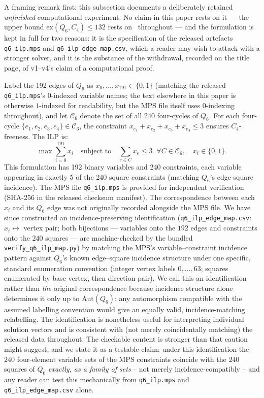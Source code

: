 \documentclass[12pt]{article}
\newcommand{\ex}{\mathrm{ex}}
\begin{document}
A framing remark first: this subsection documents a deliberately retained
\emph{unfinished} computational experiment. No claim in this paper rests
on it --- the upper bound $\ex(Q_6,C_4)\le132$ rests on~\cite{HN94}
throughout --- and the formulation is kept in full for two reasons: it is
the specification of the released artefacts \texttt{q6\_ilp.mps} and
\texttt{q6\_ilp\_edge\_map.csv}, which a reader may wish to attack with a
stronger solver, and it is the substance of the withdrawal, recorded on
the title page, of v1--v4's claim of a computational proof.

Label the 192 edges of $Q_6$ as $x_0,\ldots,x_{191}\in\{0,1\}$
(matching the released \texttt{q6\_ilp.mps}'s $0$-indexed variable
names; the text elsewhere in this paper is otherwise $1$-indexed for
readability, but the MPS file itself uses $0$-indexing throughout),
and let $\mathcal{C}_6$ denote the set of all 240 four-cycles of $Q_6$.
For each four-cycle $\{e_1,e_2,e_3,e_4\}\in\mathcal{C}_6$,
the constraint $x_{e_1}+x_{e_2}+x_{e_3}+x_{e_4}\le3$ ensures $C_4$-freeness.
The ILP is:
\[
  \max\sum_{i=0}^{191}x_i \quad\text{subject to}\quad
  \sum_{e\in C}x_e\le3\;\;\forall C\in\mathcal{C}_6,\quad x_i\in\{0,1\}.
\]
This formulation has 192 binary variables and 240 constraints, each
variable appearing in exactly 5 of the 240 square constraints (matching
$Q_6$'s edge-square incidence). The MPS file \texttt{q6\_ilp.mps} is
provided for independent verification (SHA-256 in the released checksum
manifest). The correspondence between each $x_i$ and its $Q_6$ edge was
not originally recorded alongside the MPS file. We have since
constructed an incidence-preserving identification
(\texttt{q6\_ilp\_edge\_map.csv}: $x_i\leftrightarrow$ vertex pair; both
bijections --- variables onto the $192$ edges and constraints onto the
$240$ squares --- are machine-checked by the bundled
\texttt{verify\_q6\_ilp\_map.py}) by matching the MPS's
variable--constraint incidence pattern against $Q_6$'s known
edge--square incidence structure under one specific, standard
enumeration convention (integer vertex labels $0,\ldots,63$; squares
enumerated by base vertex, then direction pair). We call this an
identification rather than \emph{the} original correspondence because
incidence structure alone determines it only up to
$\mathrm{Aut}(Q_6)$: any automorphism compatible with the assumed
labelling convention would give an equally valid, incidence-matching
relabelling. The identification is nonetheless useful for interpreting
individual solution vectors and is consistent with (not merely
coincidentally matching) the released data throughout. The checkable content
is stronger than that caution might suggest, and we state it as a testable
claim: under this identification the $240$ four-element variable sets of the
MPS constraints coincide with the $240$ squares of $Q_6$ \emph{exactly, as a
family of sets} -- not merely incidence-compatibly -- and any reader can test
this mechanically from \texttt{q6\_ilp.mps} and
\texttt{q6\_ilp\_edge\_map.csv} alone.
\end{document}
